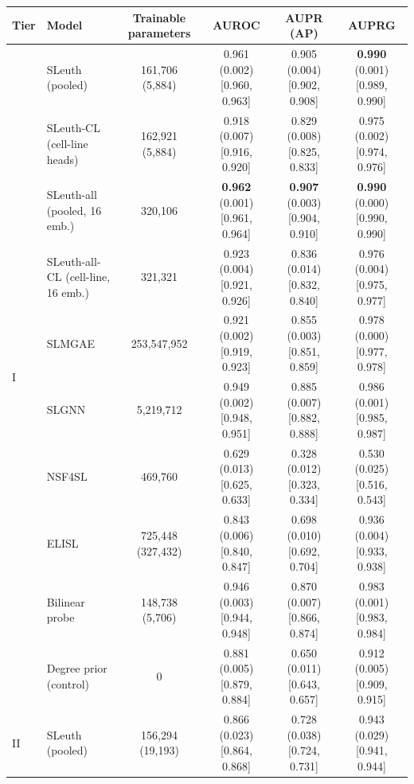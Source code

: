 \begin{tabular}{ll|cccc}
\hline
Tier & Model & Trainable parameters & AUROC & AUPR (AP) & AUPRG \\
\hline
\multirow{10}{*}{I} & SLeuth (pooled) & 161{,}706 (5{,}884) & 0.961 (0.002) {\scriptsize [0.960, 0.963]} & 0.905 (0.004) {\scriptsize [0.902, 0.908]} & \textbf{0.990} (0.001) {\scriptsize [0.989, 0.990]} \\
 & SLeuth-CL (cell-line heads) & 162{,}921 (5{,}884) & 0.918 (0.007) {\scriptsize [0.916, 0.920]} & 0.829 (0.008) {\scriptsize [0.825, 0.833]} & 0.975 (0.002) {\scriptsize [0.974, 0.976]} \\
 & SLeuth-all (pooled, 16 emb.) & 320{,}106 & \textbf{0.962} (0.001) {\scriptsize [0.961, 0.964]} & \textbf{0.907} (0.003) {\scriptsize [0.904, 0.910]} & \textbf{0.990} (0.000) {\scriptsize [0.990, 0.990]} \\
 & SLeuth-all-CL (cell-line, 16 emb.) & 321{,}321 & 0.923 (0.004) {\scriptsize [0.921, 0.926]} & 0.836 (0.014) {\scriptsize [0.832, 0.840]} & 0.976 (0.004) {\scriptsize [0.975, 0.977]} \\
 & SLMGAE & 253{,}547{,}952 & 0.921 (0.002) {\scriptsize [0.919, 0.923]} & 0.855 (0.003) {\scriptsize [0.851, 0.859]} & 0.978 (0.000) {\scriptsize [0.977, 0.978]} \\
 & SLGNN & 5{,}219{,}712 & 0.949 (0.002) {\scriptsize [0.948, 0.951]} & 0.885 (0.007) {\scriptsize [0.882, 0.888]} & 0.986 (0.001) {\scriptsize [0.985, 0.987]} \\
 & NSF4SL & 469{,}760 & 0.629 (0.013) {\scriptsize [0.625, 0.633]} & 0.328 (0.012) {\scriptsize [0.323, 0.334]} & 0.530 (0.025) {\scriptsize [0.516, 0.543]} \\
 & ELISL & 725{,}448 (327{,}432) & 0.843 (0.006) {\scriptsize [0.840, 0.847]} & 0.698 (0.010) {\scriptsize [0.692, 0.704]} & 0.936 (0.004) {\scriptsize [0.933, 0.938]} \\
 & Bilinear probe & 148{,}738 (5{,}706) & 0.946 (0.003) {\scriptsize [0.944, 0.948]} & 0.870 (0.007) {\scriptsize [0.866, 0.874]} & 0.983 (0.001) {\scriptsize [0.983, 0.984]} \\
 & Degree prior (control) & 0 & 0.881 (0.005) {\scriptsize [0.879, 0.884]} & 0.650 (0.011) {\scriptsize [0.643, 0.657]} & 0.912 (0.005) {\scriptsize [0.909, 0.915]} \\
\hline
\multirow{10}{*}{II} & SLeuth (pooled) & 156{,}294 (19{,}193) & 0.866 (0.023) {\scriptsize [0.864, 0.868]} & 0.728 (0.038) {\scriptsize [0.724, 0.731]} & 0.943 (0.029) {\scriptsize [0.941, 0.944]} \\

\end{tabular}
